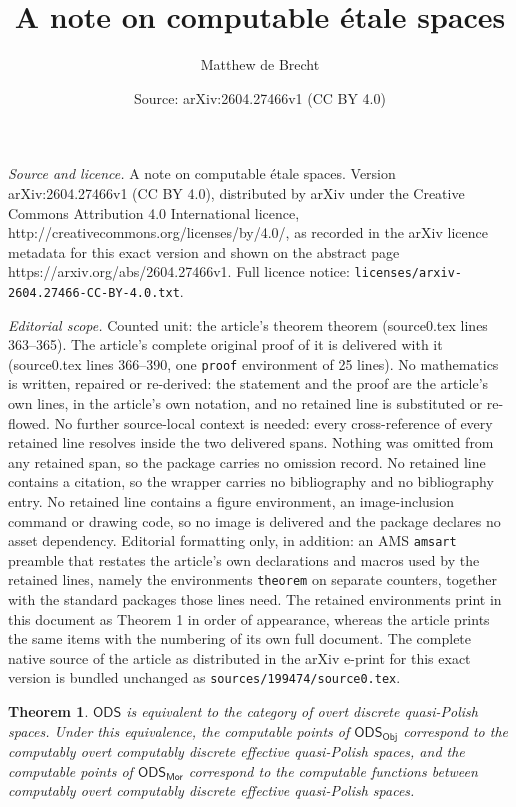 \documentclass[10pt,a4paper]{amsart}
\title{A note on computable \'{e}tale spaces}
\author{Matthew de Brecht}
\date{Source: arXiv:2604.27466v1 (CC BY 4.0)}
\newtheorem{theorem}{Theorem}
\newcommand{\Mor}{\mathsf{Mor}}
\newcommand{\Obj}{\mathsf{Obj}}
\newcommand{\cntSets}{{\mathsf{ODS}}}
\begin{document}
\maketitle

\noindent\emph{Source and licence.} A note on computable \'{e}tale spaces. Version arXiv:2604.27466v1 (CC BY 4.0), distributed by arXiv under the Creative Commons Attribution 4.0 International licence, http://creativecommons.org/licenses/by/4.0/, as recorded in the arXiv licence metadata for this exact version and shown on the abstract page https://arxiv.org/abs/2604.27466v1. Full licence notice: \texttt{licenses/arxiv-2604.27466-CC-BY-4.0.txt}.\par\smallskip

\noindent\textit{Editorial scope.} Counted unit: the article's theorem theorem (source0.tex lines 363--365). The article's complete original proof of it is delivered with it (source0.tex lines 366--390, one \texttt{proof} environment of 25 lines). No mathematics is written, repaired or re-derived: the statement and the proof are the article's own lines, in the article's own notation, and no retained line is substituted or re-flowed.  No further source-local context is needed: every cross-reference of every retained line resolves inside the two delivered spans.  Nothing was omitted from any retained span, so the package carries no omission record.  No retained line contains a citation, so the wrapper carries no bibliography and no bibliography entry.  No retained line contains a figure environment, an image-inclusion command or drawing code, so no image is delivered and the package declares no asset dependency.  Editorial formatting only, in addition: an AMS \texttt{amsart} preamble that restates the article's own declarations and macros used by the retained lines, namely the environments \texttt{theorem} on separate counters, together with the standard packages those lines need.  The retained environments print in this document as Theorem 1 in order of appearance, whereas the article prints the same items with the numbering of its own full document.  The complete native source of the article as distributed in the arXiv e-print for this exact version is bundled unchanged as \texttt{sources/199474/source0.tex}.
\begin{theorem}
$\cntSets$ is equivalent to the category of overt discrete quasi-Polish spaces. Under this equivalence, the computable points of $\cntSets_\Obj$ correspond to the computably overt computably discrete effective quasi-Polish spaces, and the computable points of $\cntSets_\Mor$ correspond to the computable functions between computably overt computably discrete effective quasi-Polish spaces.
\end{theorem}
\end{document}
